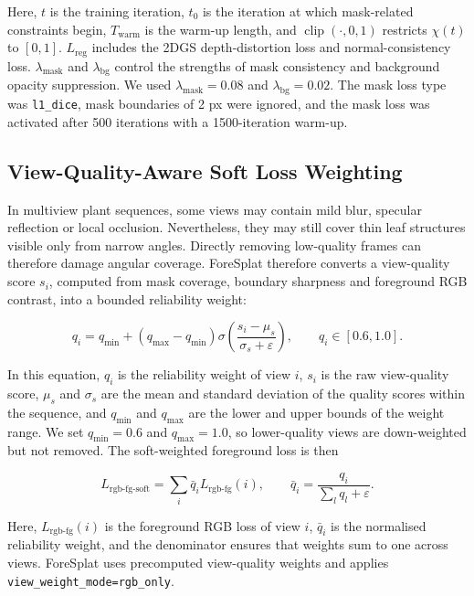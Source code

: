 \documentclass[a4paper]{cas-sc}
\begin{document}
Here, \(t\) is the training iteration, \(t_0\) is the iteration at which mask-related constraints begin, \(T_{\text{warm}}\) is the warm-up length, and \(\operatorname{clip}(\cdot,0,1)\) restricts \(\chi(t)\) to \([0,1]\). \(L_{\text{reg}}\) includes the 2DGS depth-distortion loss and normal-consistency loss. \(\lambda_{\text{mask}}\) and \(\lambda_{\text{bg}}\) control the strengths of mask consistency and background opacity suppression. We used \(\lambda_{\text{mask}}=0.08\) and \(\lambda_{\text{bg}}=0.02\). The mask loss type was \texttt{l1\_dice}, mask boundaries of 2 px were ignored, and the mask loss was activated after 500 iterations with a 1500-iteration warm-up.

\subsection{View-Quality-Aware Soft Loss Weighting}\label{sec:view-quality-aware-soft-loss-weighting}

In multiview plant sequences, some views may contain mild blur, specular reflection or local occlusion. Nevertheless, they may still cover thin leaf structures visible only from narrow angles. Directly removing low-quality frames can therefore damage angular coverage. ForeSplat therefore converts a view-quality score \(s_i\), computed from mask coverage, boundary sharpness and foreground RGB contrast, into a bounded reliability weight:

\[
q_i=q_{\min}+(q_{\max}-q_{\min})
\sigma\left(\frac{s_i-\mu_s}{\sigma_s+\varepsilon}\right),
\qquad q_i\in[0.6,1.0].
\]

In this equation, \(q_i\) is the reliability weight of view \(i\), \(s_i\) is the raw view-quality score, \(\mu_s\) and \(\sigma_s\) are the mean and standard deviation of the quality scores within the sequence, and \(q_{\min}\) and \(q_{\max}\) are the lower and upper bounds of the weight range. We set \(q_{\min}=0.6\) and \(q_{\max}=1.0\), so lower-quality views are down-weighted but not removed. The soft-weighted foreground loss is then

\[
L_{\text{rgb-fg-soft}}=\sum_i \bar{q}_i L_{\text{rgb-fg}}(i),\qquad
\bar{q}_i=\frac{q_i}{\sum_l q_l+\varepsilon}.
\]

Here, \(L_{\text{rgb-fg}}(i)\) is the foreground RGB loss of view \(i\), \(\bar{q}_i\) is the normalised reliability weight, and the denominator ensures that weights sum to one across views. ForeSplat uses precomputed view-quality weights and applies \texttt{view\_weight\_mode=rgb\_only}.
\end{document}
